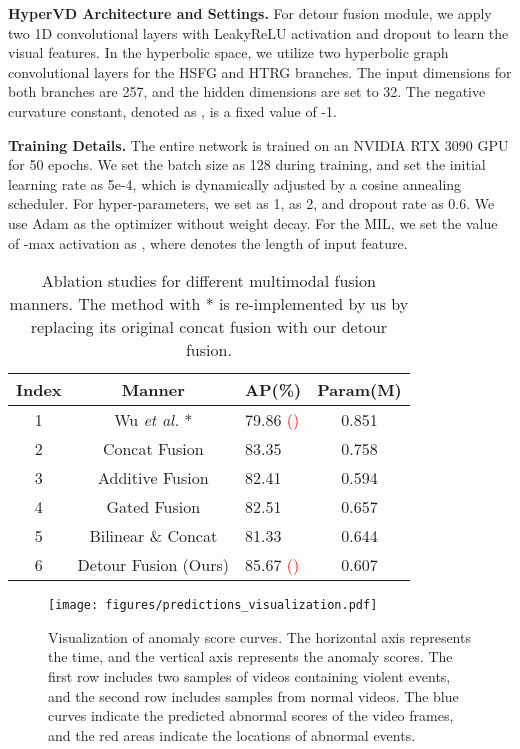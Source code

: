 \documentclass[sigconf]{acmart}
\newcommand{\etal}{{\emph{et al. }}}
\begin{document}
\noindent\textbf{HyperVD Architecture and Settings.} For detour fusion module, we apply two 1D convolutional layers with LeakyReLU activation and dropout to learn the visual features. In the hyperbolic space, we utilize two hyperbolic graph convolutional layers for the HSFG and HTRG branches. The input dimensions for both branches are 257, and the hidden dimensions are set to 32. The negative curvature constant, denoted as , is a fixed value of -1.

\noindent\textbf{Training Details.} The entire network is trained on an NVIDIA RTX 3090 GPU for 50 epochs. We set the batch size as 128 during training, and set the initial learning rate as 5e-4, which is dynamically adjusted by a cosine annealing scheduler. For hyper-parameters, we set  as 1,  as 2, and dropout rate as 0.6. We use Adam as the optimizer without weight decay. For the MIL, we set the value  of -max activation as , where  denotes the length of input feature.

\begin{table}[t]
  \caption{Ablation studies for different multimodal fusion manners. The method with * is re-implemented by us by replacing its original concat fusion with our detour fusion.}
  \label{table2}
  \begin{tabular}{cclc}
    \toprule
    Index    & Manner  & AP(\%) & Param(M)\\
    \midrule 
     1 &     Wu \etal* \cite{c:2}  & 79.86 \textcolor{red}{()} & 0.851  \\\midrule 
     2 &      Concat Fusion &	83.35	& 0.758\\
     3 &     Additive Fusion &	82.41	& 0.594 \\
     4 &      Gated Fusion	&   82.51	& 0.657  \\
     5 &     Bilinear \& Concat	& 81.33	& 0.644\\
     6 &     Detour Fusion (Ours)& 85.67 \textcolor{red}{()}	& 0.607 \\ 
    \bottomrule
\end{tabular}
\end{table}

\begin{figure*}[t]
	\centering
	\texttt{[image: figures/predictions\_visualization.pdf]} \caption{Visualization of anomaly score curves. The horizontal axis represents the time, and the vertical axis represents the anomaly scores. The first row includes two samples of videos containing violent events, and the second row includes samples from normal videos. The blue curves indicate the predicted abnormal scores of the video frames, and the red areas indicate the locations of abnormal events.}
	\label{fig3}
\end{figure*}
\end{document}
